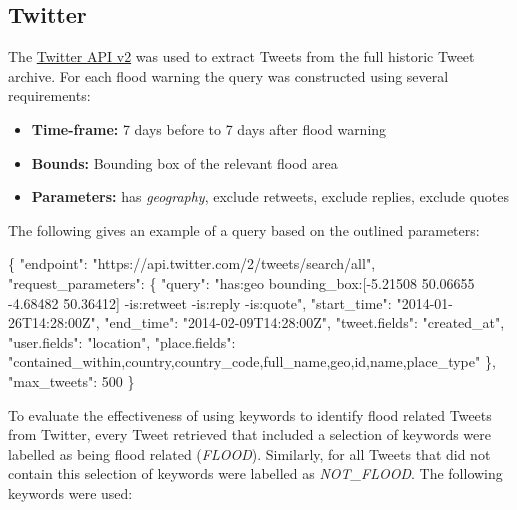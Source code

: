 \documentclass[a4paper, notitlepage]{extreport}
\providecommand{\tightlist}{%
  \setlength{\itemsep}{0pt}\setlength{\parskip}{0pt}}
\newenvironment{Shaded}{\begin{snugshade}}{\end{snugshade}}
\newcommand{\DataTypeTok}[1]{\textcolor[rgb]{0.13,0.29,0.53}{#1}}
\newcommand{\DecValTok}[1]{\textcolor[rgb]{0.00,0.00,0.81}{#1}}
\newcommand{\FunctionTok}[1]{\textcolor[rgb]{0.00,0.00,0.00}{#1}}
\newcommand{\StringTok}[1]{\textcolor[rgb]{0.31,0.60,0.02}{#1}}
\begin{document}
\hypertarget{twitter}{%
\subsection{Twitter}\label{twitter}}

The
\href{https://developer.twitter.com/en/docs/twitter-api/early-access}{Twitter
API v2} was used to extract Tweets from the full historic Tweet archive.
For each flood warning the query was constructed using several
requirements:

\begin{itemize}
\tightlist
\item
  \textbf{Time-frame:} 7 days before to 7 days after flood warning
\item
  \textbf{Bounds:} Bounding box of the relevant flood area
\item
  \textbf{Parameters:} has \emph{geography}, exclude retweets, exclude
  replies, exclude quotes
\end{itemize}

The following gives an example of a query based on the outlined
parameters:

\begin{Shaded}
\begin{Highlighting}[]
\FunctionTok{\{}
    \DataTypeTok{"endpoint"}\FunctionTok{:} \StringTok{"https://api.twitter.com/2/tweets/search/all"}\FunctionTok{,}
    \DataTypeTok{"request\_parameters"}\FunctionTok{:} \FunctionTok{\{}
        \DataTypeTok{"query"}\FunctionTok{:} \StringTok{"has:geo bounding\_box:[{-}5.21508 50.06655 {-}4.68482 50.36412]}
\StringTok{            {-}is:retweet {-}is:reply {-}is:quote"}\FunctionTok{,}
        \DataTypeTok{"start\_time"}\FunctionTok{:} \StringTok{"2014{-}01{-}26T14:28:00Z"}\FunctionTok{,}
        \DataTypeTok{"end\_time"}\FunctionTok{:} \StringTok{"2014{-}02{-}09T14:28:00Z"}\FunctionTok{,}
        \DataTypeTok{"tweet.fields"}\FunctionTok{:} \StringTok{"created\_at"}\FunctionTok{,}
        \DataTypeTok{"user.fields"}\FunctionTok{:} \StringTok{"location"}\FunctionTok{,}
        \DataTypeTok{"place.fields"}\FunctionTok{:} \StringTok{"contained\_within,country,country\_code,full\_name,geo,id,name,place\_type"}
    \FunctionTok{\},}
    \DataTypeTok{"max\_tweets"}\FunctionTok{:} \DecValTok{500}
\FunctionTok{\}}
\end{Highlighting}
\end{Shaded}

To evaluate the effectiveness of using keywords to identify flood
related Tweets from Twitter, every Tweet retrieved that included a
selection of keywords were labelled as being flood related
(\emph{FLOOD}). Similarly, for all Tweets that did not contain this
selection of keywords were labelled as \emph{NOT\_FLOOD}. The following
keywords were used:
\end{document}

